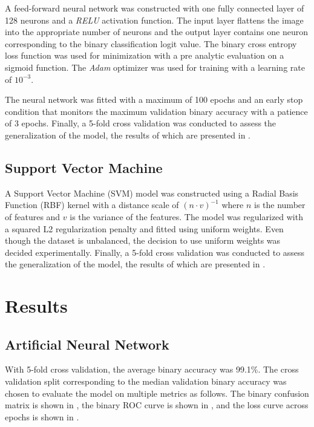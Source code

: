 \documentclass[twocolumn]{article}
\begin{document}
A feed-forward neural network was constructed with one fully connected layer of
128 neurons and a \emph{RELU} activation function. The input layer flattens the
image into the appropriate number of neurons and the output layer contains one
neuron corresponding to the binary classification logit value. The binary cross
entropy loss function was used for minimization with a pre analytic evaluation
on a sigmoid function. The \emph{Adam} optimizer was used for training with a
learning rate of $10^{-3}$.

The neural network was fitted with a maximum of 100 epochs and an early stop
condition that monitors the maximum validation binary accuracy with a patience
of 3 epochs. Finally, a 5-fold cross validation was conducted to assess the
generalization of the model, the results of which are presented in
.

\subsection{Support Vector Machine}

A Support Vector Machine (SVM) model was constructed using a Radial Basis
Function (RBF) kernel with a distance scale of $(n \cdot v)^{-1}$ where $n$ is
the number of features and $v$ is the variance of the features. The model was
regularized with a squared L2 regularization penalty and fitted using uniform
weights. Even though the dataset is unbalanced, the decision to use uniform
weights was decided experimentally. Finally, a 5-fold cross validation was
conducted to assess the generalization of the model, the results of which are
presented in .

\section{Results}
\label{sec:Results}

\subsection{Artificial Neural Network}

With 5-fold cross validation, the average binary accuracy was 99.1\%. The
cross validation split corresponding to the median validation binary accuracy
was chosen to evaluate the model on multiple metrics as follows. The binary
confusion matrix is shown in , the binary
ROC curve is shown in , and the loss curve across
epochs is shown in .
\end{document}
